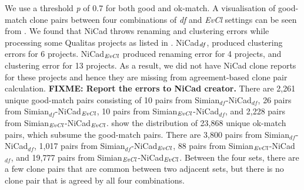 \documentclass{sig-alternate-05-2015}
\newcommand\FIXME[1]{\textbf{FIXME: #1}}
\begin{document}
We use a threshold \textit{p} of 0.7 for both good and ok-match. A visualisation of good-match clone pairs between four combinations of \textit{df} and \textit{EvCl} settings can be seen from . We found that NiCad throws renaming and clustering errors while processing some Qualitas projects as listed in . %
NiCad$_{\textrm{\textit{df}}}$, produced clustering errors for 6 projects. NiCad$_{\textrm{\textit{EvCl}}}$ produced renaming error for 4 projects, and clustering error for 13 projects. As a result, we did not have NiCad clone reports for these projects and hence they are missing from agreement-based clone pair calculation. \FIXME{Report the errors to NiCad creator.} There are 2,261 unique good-match pairs consisting of 10 pairs from Simian$_{df}$-NiCad$_{df}$, 26 pairs from Simian$_{df}$-NiCad$_{\textrm{\textit{EvCl}}}$, 10 pairs from Simian$_{\textrm{\textit{EvCl}}}$-NiCad$_{df}$, and 2,228 pairs from Simian$_{\textrm{\textit{EvCl}}}$-NiCad$_{\textrm{\textit{EvCl}}}$.  show the distribution of 23,868 unique ok-match pairs, which subsume the good-match pairs. There are 3,800 pairs from Simian$_{df}$-NiCad$_{df}$, 1,017 pairs from Simian$_{df}$-NiCad$_{\textrm{\textit{EvCl}}}$, 88 pairs from Simian$_{\textrm{\textit{EvCl}}}$-NiCad$_{df}$, and 19,777 pairs from Simian$_{\textrm{\textit{EvCl}}}$-NiCad$_{\textrm{\textit{EvCl}}}$. Between the four sets, there are a few clone pairs that are common between two adjacent sets, but there is no clone pair that is agreed by all four combinations.

\end{document}
